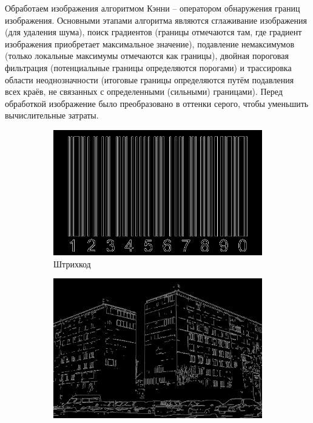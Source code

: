 \documentclass[a4paper, 16pt]{article}
\begin{document}
    \newpage
    \noindent Обработаем изображения алгоритмом Кэнни -- оператором обнаружения границ изображения. Основными
    этапами алгоритма являются сглаживание изображения (для удаления шума), поиск градиентов (границы отмечаются там,
    где градиент изображения приобретает максимальное значение), подавление немаксимумов (только локальные максимумы
    отмечаются как границы), двойная пороговая фильтрация (потенциальные границы определяются порогами) и трассировка
    области неоднозначности (итоговые границы определяются путём подавления всех краёв, не связанных с определенными
    (сильными) границами). Перед обработкой изображение было преобразовано в оттенки серого, чтобы уменьшить вычислительные затраты.
    \begin{figure}[htbp]
        \centering
        \begin{subfigure}{0.3\textwidth}
            \centering
            \includegraphics[width=\linewidth]{canny_i1.png}
            \caption{Штрихкод}
            \label{fig:canny_i1}
        \end{subfigure}
        \hfill
        \begin{subfigure}{0.3\textwidth}
            \centering
            \includegraphics[width=\linewidth]{canny_i2.png}

\end{subfigure}
\end{figure}
\end{document}
